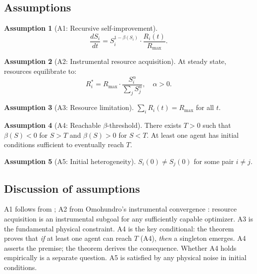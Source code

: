 \documentclass[11pt,letterpaper]{article}
\theoremstyle{plain}
\theoremstyle{definition}
\newtheorem{assumption}{Assumption}
\theoremstyle{remark}
\newcommand{\Rmax}{R_{\max}}
\begin{document}
\subsection{Assumptions}

\begin{assumption}[A1: Recursive self-improvement]
\label{ass:A1}
\[
  \frac{dS_i}{dt} = S_i^{1-\beta(S_i)} \cdot \frac{R_i(t)}{\Rmax}.
\]
\end{assumption}

\begin{assumption}[A2: Instrumental resource acquisition]
\label{ass:A2}
At steady state, resources equilibrate to:
\[
  R_i^* = \Rmax \cdot \frac{S_i^\alpha}{\sum_j S_j^\alpha}, \quad \alpha > 0.
\]
\end{assumption}

\begin{assumption}[A3: Resource limitation]
\label{ass:A3}
$\sum_i R_i(t) = \Rmax$ for all $t$.
\end{assumption}

\begin{assumption}[A4: Reachable $\beta$-threshold]
\label{ass:A4}
There exists $T > 0$ such that $\beta(S) < 0$ for $S > T$ and
$\beta(S) > 0$ for $S < T$.
At least one agent has initial conditions sufficient to eventually reach $T$.
\end{assumption}

\begin{assumption}[A5: Initial heterogeneity]
\label{ass:A5}
$S_i(0) \neq S_j(0)$ for some pair $i \neq j$.
\end{assumption}

\subsection{Discussion of assumptions}

A1 follows from \citet{yudkowsky2013intelligence}; A2 from Omohundro's
instrumental convergence \citep{omohundro2008basic}: resource acquisition is
an instrumental subgoal for any sufficiently capable optimizer.
A3 is the fundamental physical constraint.
A4 is the key conditional: the theorem proves that \emph{if} at least one
agent can reach $T$ (A4), \emph{then} a singleton emerges.
A4 asserts the premise; the theorem derives the consequence.
Whether A4 holds empirically is a separate question.
A5 is satisfied by any physical noise in initial conditions.
\end{document}
